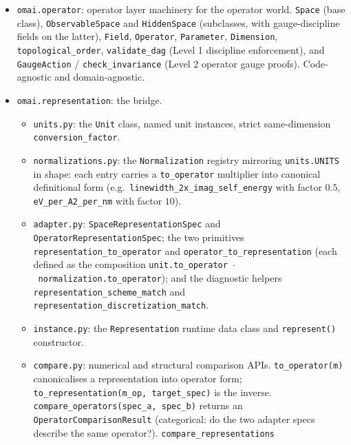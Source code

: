 \documentclass[11pt,a4paper]{article}
\begin{document}
\begin{itemize}[leftmargin=2em, itemsep=0.3em]
  \item \texttt{omai.operator}: operator layer machinery for the operator world.
        \texttt{Space} (base class), \texttt{ObservableSpace} and \texttt{HiddenSpace}
        (subclasses, with gauge-discipline fields on the latter), \texttt{Field},
        \texttt{Operator}, \texttt{Parameter}, \texttt{Dimension},
        \texttt{topological\_order},
        \texttt{validate\_dag} (Level 1 discipline enforcement), and
        \texttt{GaugeAction} / \texttt{check\_invariance} (Level 2 operator
        gauge proofs). Code-agnostic and domain-agnostic.
  \item \texttt{omai.representation}: the bridge.
    \begin{itemize}[leftmargin=1.2em]
      \item \texttt{units.py}: the \texttt{Unit} class, named unit instances, strict
            same-dimension \texttt{conversion\_factor}.
      \item \texttt{normalizations.py}: the \texttt{Normalization} registry
            mirroring \texttt{units.UNITS} in shape: each entry carries a
            \texttt{to\_operator} multiplier into canonical definitional form
            (e.g.\ \texttt{linewidth\_2x\_imag\_self\_energy} with factor
            $0.5$, \texttt{eV\_per\_A2\_per\_nm} with factor $10$).
      \item \texttt{adapter.py}: \texttt{SpaceRepresentationSpec} and
            \texttt{OperatorRepresentationSpec}; the two primitives
            \texttt{representation\_to\_operator} and
            \texttt{operator\_to\_representation} (each defined as the
            composition \texttt{unit.to\_operator}~$\cdot$~\texttt{normalization.to\_operator});
            and the diagnostic helpers
            \texttt{representation\_scheme\_match} and
            \texttt{representation\_discretization\_match}.
      \item \texttt{instance.py}: the \texttt{Representation} runtime data class
            and \texttt{represent()} constructor.
      \item \texttt{compare.py}: numerical and structural comparison APIs.
            \texttt{to\_operator(m)} canonicalises a representation into operator
            form; \texttt{to\_representation(m\_op, target\_spec)} is the
            inverse. \texttt{compare\_operators(spec\_a, spec\_b)} returns an
            \texttt{OperatorComparisonResult} (categorical: do the two adapter
            specs describe the same operator?). \texttt{compare\_representations}

\end{itemize}
\end{itemize}
\end{document}
